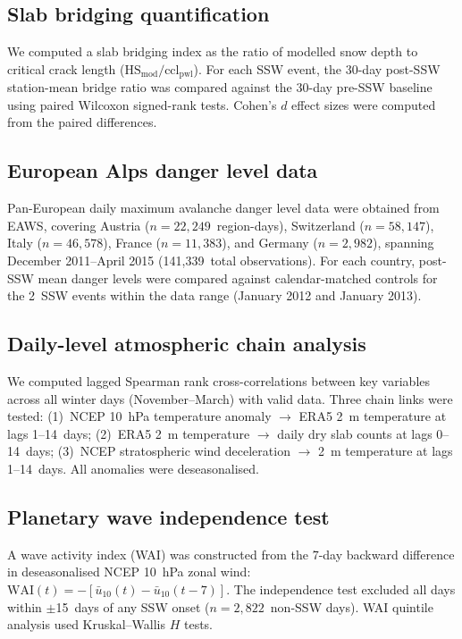 \documentclass[11pt,letterpaper]{article}
\begin{document}
\subsection{Slab bridging quantification}

We computed a slab bridging index as the ratio of modelled snow depth to critical crack length ($\mathrm{HS_{mod}} / \mathrm{ccl_{pwl}}$). For each SSW event, the 30-day post-SSW station-mean bridge ratio was compared against the 30-day pre-SSW baseline using paired Wilcoxon signed-rank tests. Cohen's $d$ effect sizes were computed from the paired differences.

\subsection{European Alps danger level data}

Pan-European daily maximum avalanche danger level data were obtained from EAWS, covering Austria ($n = 22{,}249$~region-days), Switzerland ($n = 58{,}147$), Italy ($n = 46{,}578$), France ($n = 11{,}383$), and Germany ($n = 2{,}982$), spanning December 2011--April 2015 (141{,}339~total observations). For each country, post-SSW mean danger levels were compared against calendar-matched controls for the 2~SSW events within the data range (January 2012 and January 2013).

\subsection{Daily-level atmospheric chain analysis}

We computed lagged Spearman rank cross-correlations between key variables across all winter days (November--March) with valid data. Three chain links were tested: (1)~NCEP 10~hPa temperature anomaly $\to$ ERA5 2~m temperature at lags 1--14~days; (2)~ERA5 2~m temperature $\to$ daily dry slab counts at lags 0--14~days; (3)~NCEP stratospheric wind deceleration $\to$ 2~m temperature at lags 1--14~days. All anomalies were deseasonalised.

\subsection{Planetary wave independence test}

A wave activity index (WAI) was constructed from the 7-day backward difference in deseasonalised NCEP 10~hPa zonal wind: $\mathrm{WAI}(t) = -[\bar{u}_{10}(t) - \bar{u}_{10}(t{-}7)]$. The independence test excluded all days within $\pm$15~days of any SSW onset ($n = 2{,}822$~non-SSW days). WAI quintile analysis used Kruskal--Wallis $H$ tests.
\end{document}
